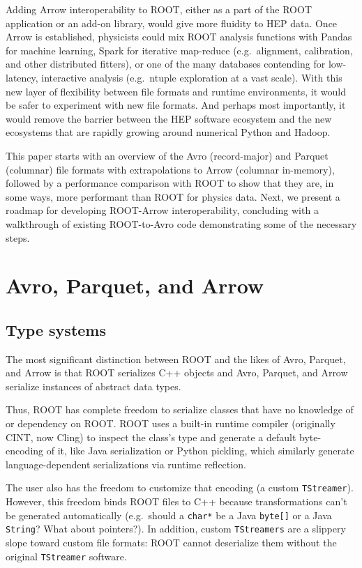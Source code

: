 \documentclass{article}
\begin{document}
Adding Arrow interoperability to ROOT, either as a part of the ROOT application or an add-on library, would give more fluidity to HEP data. Once Arrow is established, physicists could mix ROOT analysis functions with Pandas for machine learning, Spark for iterative map-reduce (e.g.\ alignment, calibration, and other distributed fitters), or one of the many databases contending for low-latency, interactive analysis (e.g.\ ntuple exploration at a vast scale). With this new layer of flexibility between file formats and runtime environments, it would be safer to experiment with new file formats. And perhaps most importantly, it would remove the barrier between the HEP software ecosystem and the new ecosystems that are rapidly growing around numerical Python and Hadoop.

This paper starts with an overview of the Avro (record-major) and Parquet (columnar) file formats with extrapolations to Arrow (columnar in-memory), followed by a performance comparison with ROOT to show that they are, in some ways, more performant than ROOT for physics data. Next, we present a roadmap for developing ROOT-Arrow interoperability, concluding with a walkthrough of existing ROOT-to-Avro code demonstrating some of the necessary steps.

\section*{Avro, Parquet, and Arrow}

\subsection*{Type systems}

The most significant distinction between ROOT and the likes of Avro, Parquet, and Arrow is that ROOT serializes C++ objects and Avro, Parquet, and Arrow serialize instances of abstract data types.

Thus, ROOT has complete freedom to serialize classes that have no knowledge of or dependency on ROOT. ROOT uses a built-in runtime compiler (originally CINT, now Cling) to inspect the class's type and generate a default byte-encoding of it, like Java serialization or Python pickling, which similarly generate language-dependent serializations via runtime reflection.

The user also has the freedom to customize that encoding (a custom {\tt TStreamer}). However, this freedom binds ROOT files to C++ because transformations can't be generated automatically (e.g.\ should a {\tt char*} be a Java {\tt byte[]} or a Java {\tt String}? What about pointers?). In addition, custom {\tt TStreamers} are a slippery slope toward custom file formats: ROOT cannot deserialize them without the original {\tt TStreamer} software.
\end{document}
